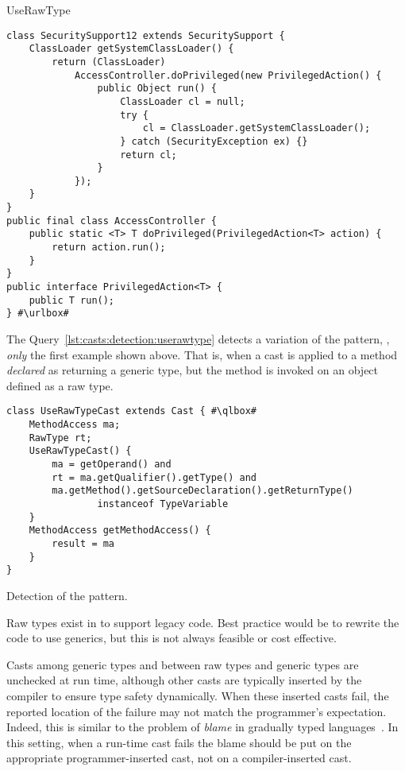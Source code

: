 \begin{pattern}{UseRawType}
\def\urlvar{http://bit.ly/robovm_robovm_2FAI5x5}
\begin{verbatim}
class SecuritySupport12 extends SecuritySupport {
    ClassLoader getSystemClassLoader() {
        return (ClassLoader)
            AccessController.doPrivileged(new PrivilegedAction() {
                public Object run() {
                    ClassLoader cl = null;
                    try {
                        cl = ClassLoader.getSystemClassLoader();
                    } catch (SecurityException ex) {}
                    return cl;
                }
            });
    }
}
public final class AccessController {
    public static <T> T doPrivileged(PrivilegedAction<T> action) {
        return action.run();
    }
}
public interface PrivilegedAction<T> {
    public T run();
} #\urlbox#
\end{verbatim}


\detection{}
The Query~\ref{lst:casts:detection:userawtype} detects a variation of the \thisp{} pattern, \eg{}, \emph{only} the first example shown above.
That is, when a cast is applied to a method \emph{declared} as returning a generic type,
but the method is invoked on an object defined as a raw type.

\begin{listing}
\begin{verbatim}
class UseRawTypeCast extends Cast { #\qlbox#
	MethodAccess ma;
	RawType rt;
	UseRawTypeCast() {
		ma = getOperand() and
		rt = ma.getQualifier().getType() and
		ma.getMethod().getSourceDeclaration().getReturnType()
				instanceof TypeVariable
	}
	MethodAccess getMethodAccess() {
		result = ma
	}
}
\end{verbatim}
\caption{Detection of the \thisp{} pattern.}
\label{lst:casts:detection:userawtype}
\end{listing}


\issues{}
Raw types exist in \java{} to support legacy code.
Best practice would be to rewrite the code to use generics,
but this is not always feasible or cost effective.

Casts among generic types and between raw types and generic types are unchecked at run time,
although other casts are typically inserted by the compiler to ensure type safety dynamically.
When these inserted casts fail, the reported location of the failure may not match the programmer's expectation.
Indeed, this is similar to the problem of \emph{blame} in gradually typed languages~\citep{wadlerWellTypedProgramsCan2009}.
In this setting, when a run-time cast fails the blame should be put on the appropriate programmer-inserted cast,
not on a compiler-inserted cast.

\end{pattern}
